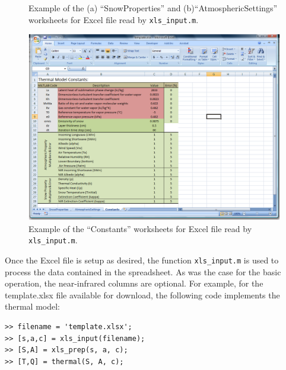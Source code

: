 \begin{figure}[ht!]\centering
{}\\
\\
\caption{Example of the (a) ``SnowProperties'' and  (b)``AtmosphericSettings'' worksheets for Excel file read by \texttt{xls\_input.m}.}
\label{TM:fig:snowatm}
\end{figure}

\begin{figure}[b!]\centering
\includegraphics[width=\linewidth]{figures/constants.png}
\caption{Example of the ``Constants'' worksheets for Excel file read by \texttt{xls\_input.m}.}
\label{TM:fig:constants}
\end{figure}

Once the Excel file is setup as desired, the function \texttt{xls\_input.m} is used to process the data contained in the spreadsheet. As was the case for the basic operation, the near-infrared columns are optional.  For example, for the template.xlsx file available for download, the following code implements the thermal model:
\begin{singlespaced}\begin{lstlisting}[style=inline]
>> filename = 'template.xlsx';
>> [s,a,c] = xls_input(filename);
>> [S,A] = xls_prep(s, a, c);
>> [T,Q] = thermal(S, A, c); 
\end{lstlisting}\end{singlespaced}


